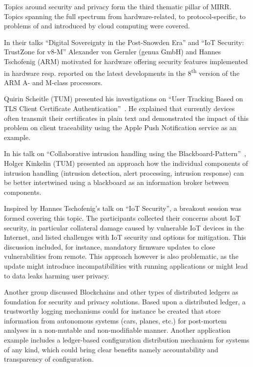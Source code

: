 Topics around security and privacy form the third thematic pillar of MIRR.
Topics spanning the full spectrum from hardware-related, to protocol-specific,
to problems of and introduced by cloud computing were covered.


In their talks ``Digital Sovereignty in the Post-Snowden Era'' and ``IoT
Security: TrustZone for v8-M'' Alexander von Gernler (genua GmbH) and Hannes
Tschofenig (ARM) motivated for hardware offering security features implemented
in hardware resp. reported on the latest developments in the
8\textsuperscript{th} version of the ARM A- and M-class processors.

Quirin Scheitle (TUM) presented his investigations on ``User Tracking Based on
TLS Client Certificate Authentication''~\cite{qscheitle:tma:2017}. He explained
that currently devices often transmit their certificates in plain text and
demonstrated the impact of this problem on client traceability using the Apple
Push Notification service as an example.

In his talk on ``Collaborative intrusion handling using the
Blackboard-Pattern''~\cite{herold:iscs:2016}, Holger Kinkelin (TUM) presented an
approach how the individual components of intrusion handling (intrusion
detection, alert processing, intrusion response) can be better intertwined using
a blackboard as an information broker between components.


Inspired by Hannes Tschofenig's talk on ``IoT Security'', a breakout session was
formed covering this topic. The participants collected their concerns about IoT
security, in particular collateral damage caused by vulnerable IoT devices in
the Internet, and listed challenges with IoT security and options for
mitigation. This discussion included, for instance, mandatory firmware updates
to close vulnerabilities from remote. This approach however is also problematic,
as the update might introduce incompatibilities with running applications or
might lead to data leaks harming user privacy.

Another group discussed Blockchains and other types of distributed ledgers as
foundation for security and privacy solutions. Based upon a distributed ledger,
a trustworthy logging mechanisms could for instance be created that store
information from autonomous systems (cars, planes, etc.) for post-mortem
analyses in a non-mutable and non-modifiable manner. Another application example
includes a ledger-based configuration distribution mechanism for systems of any
kind, which could bring clear benefits namely accountability and transparency of
configuration.

